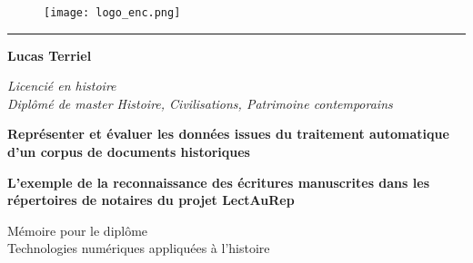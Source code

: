 \begin{titlepage}
    \begin{center}
    
\begin{figure}[h]
    \centering
    \centerline{\texttt{[image: logo\_enc.png]}}
\end{figure}

        \bigskip
    
    
        \begin{center}
            \rule{4cm}{0.02cm}
        \end{center}
    
        \hugeskip
        
        \begin{Large}
             \textbf{Lucas Terriel}\\
        \end{Large}
        \begin{normalsize}
            \textit{Licencié en histoire}\\
            \textit{Diplômé de master 
            Histoire, Civilisations, Patrimoine contemporains}\\
        \end{normalsize}
        
        \hugeskip
        \bigskip
        
        \begin{LARGE}
            \textbf{Représenter et évaluer les données issues du traitement automatique d'un corpus de documents historiques}
            
        \end{LARGE}
        \bigskip
        \bigskip
        \bigskip
        \bigskip
        \begin{large}
            \textbf{L'exemple de la reconnaissance des écritures manuscrites dans les répertoires de notaires du projet LectAuRep}\\
        \end{large}
        
        \hugeskip
        \vfill
        
        
        
        \begin{large}
            Mémoire pour le diplôme\\
            \og Technologies numériques appliquées à l'histoire \fg\\
        \end{large}
        

\end{center}
\end{titlepage}
